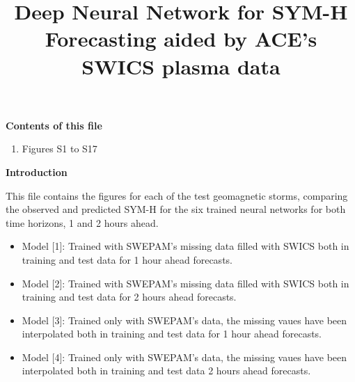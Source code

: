 \documentclass[draft,sw]{agutexSI2019}
\begin{document}
\title{Deep Neural Network for SYM-H Forecasting aided by ACE's SWICS plasma data}



\begin{article}

\renewcommand\tablename{Figure}



\noindent\textbf{Contents of this file}
\begin{enumerate}
\item Figures S1 to S17
\end{enumerate}



\noindent\textbf{Introduction}

This file contains the figures for each of the test geomagnetic storms, comparing the observed and predicted SYM-H for the six trained neural networks for both time horizons, 1 and 2 hours ahead. 

\begin{itemize}
    \item Model [1]: Trained with SWEPAM's missing data filled with SWICS both in training and test data for 1 hour ahead forecasts.
    \vspace*{-5pt}
    \item Model [2]: Trained with SWEPAM's missing data filled with SWICS both in training and test data for 2 hours ahead forecasts.
    \vspace*{-5pt}
    \item Model [3]: Trained only with SWEPAM's data, the missing vaues have been interpolated both in training and test data for 1 hour ahead forecasts.
    \vspace*{-5pt}
    \item Model [4]: Trained only with SWEPAM's data, the missing vaues have been interpolated both in training and test data 2 hours ahead forecasts.
\end{itemize}


\end{article}
\clearpage
\end{document}
